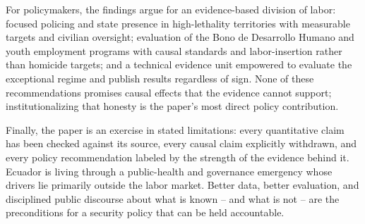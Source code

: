 For policymakers, the findings argue for an evidence-based division of labor: focused policing and state presence in high-lethality territories with measurable targets and civilian oversight; evaluation of the Bono de Desarrollo Humano and youth employment programs with causal standards and labor-insertion rather than homicide targets; and a technical evidence unit empowered to evaluate the exceptional regime and publish results regardless of sign. None of these recommendations promises causal effects that the evidence cannot support; institutionalizing that honesty is the paper's most direct policy contribution.


Finally, the paper is an exercise in stated limitations: every quantitative claim has been checked against its source, every causal claim explicitly withdrawn, and every policy recommendation labeled by the strength of the evidence behind it. Ecuador is living through a public-health and governance emergency whose drivers lie primarily outside the labor market. Better data, better evaluation, and disciplined public discourse about what is known -- and what is not -- are the preconditions for a security policy that can be held accountable.